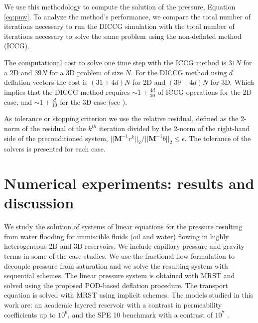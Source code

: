 \documentclass[times,final]{elsarticle}
\begin{document}
We use this methodology to compute the solution of the  pressure, Equation \eqref{eq:pnw}. To analyze the method's performance, we compare the total number of iterations necessary to run the DICCG simulation with the total number of iterations necessary to solve the same problem using the non-deflated method (ICCG). \par
The computational cost to solve one time step  with the ICCG method is $31 N$ for a 2D and $39N$ for a 3D problem of size $N$. For the DICCG method using $d$ deflation vectors the cost is $(31+4d)N$ for 2D and $(39+4d)N$ for 3D. Which implies that the DICCG method requires $\sim 1+ \frac{4d}{30}$ of ICCG operations for the 2D case, and $\sim 1+ \frac{d}{10}$ for the 3D case (see \cite{Diaz18_TU}). \par
As tolerance or stopping criterion we use the relative residual, defined as the 2-norm of the residual of the $k^{th}$ iteration divided by 
the 2-norm of the right-hand side of the preconditioned system, ${||\mathbf{M}^{-1}r^k||_2}\slash {||\mathbf{M}^{-1}b||_2}\leq \epsilon.$
The tolerance of the solvers is presented for each case.

\section{Numerical experiments: results and discussion}\label{sec:4}
 We study the solution of systems of linear equations for the pressure resulting from water flooding for immiscible fluids (oil and water) flowing in highly heterogeneous 2D and 3D reservoirs. We include capillary pressure and gravity terms in some of the case studies. We use the fractional flow formulation to decouple pressure from saturation and we solve the resulting system with sequential schemes. The linear pressure system is obtained with MRST and solved using the proposed POD-based deflation procedure. The transport equation is solved with MRST using implicit schemes. 
The models studied in this work are: an academic layered reservoir with a contrast in permeability coefficients up to $10^{6}$, and the SPE 10 benchmark with a contrast of $10^{7}$ \cite{Christie01}. \par
\end{document}
